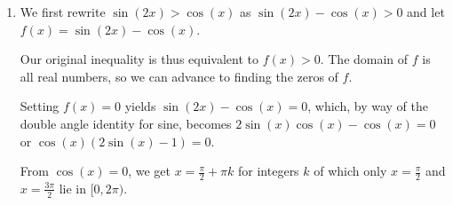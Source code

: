 \documentclass{ximera}
\begin{document}
\begin{example}
\begin{explanation}
\begin{enumerate}
 

 Next, we choose test values in $[0,2\pi)$ other than the zeros and determine if $f$ is positive or negative there.  For $t = 0$ we have $f(0) = -1$, for $t = \frac{\pi}{2}$ we get $f\left(\frac{\pi}{2}\right) = 1$ and for $t = \pi$ we get $f(\pi) = -1$.   Our sign diagram is below. 
 
  \begin{image}
% 
\end{image}

 
 Since our original inequality is equivalent to $f(t) \leq 0$, we are looking for where the function is negative $(-)$ or $0$, and we get the intervals $\left[0, \frac{\pi}{6}\right] \cup \left[\frac{5\pi}{6}, 2\pi \right)$.  We can confirm our answer graphically by seeing where the graph of $y = 2\sin(t)$ crosses or is below the graph of $y = 1$. 



\begin{center}
\end{center}
 

\item  We first rewrite  $\sin(2x) > \cos(x)$   as $\sin(2x) - \cos(x) > 0$ and let $f(x) = \sin(2x) - \cos(x)$.  

 

Our original inequality is thus equivalent to $f(x) > 0$.  The domain of $f$ is all real numbers, so we can advance to finding the zeros of $f$. 

 

Setting $f(x) = 0$ yields $\sin(2x) - \cos(x) = 0$, which, by way of the double angle identity for sine, becomes $2\sin(x)\cos(x) - \cos(x) = 0$ or $\cos(x) (2\sin(x) - 1) = 0$.  

 

From $\cos(x) = 0$, we get $x = \frac{\pi}{2} + \pi k$ for integers $k$ of which only $x = \frac{\pi}{2}$ and $x = \frac{3\pi}{2}$ lie in $[0,2\pi)$.  


\end{enumerate}
\end{explanation}
\end{example}
\end{document}
